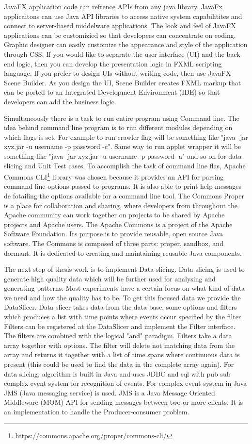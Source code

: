 \documentclass[article,type=msc,colorback,accentcolor=tud9c,twoside,11pt]{tudthesis}
\begin{document}
JavaFX application code can refrence APIs from any java library. JavaFx applicaitons can use Java API libraries to access native system capabilitites and connect to server-based middelware applications. The look and feel of JavaFX applications can be customizied so that developers can concentrate on coding. Graphic designer can easily customize the appearance and style of the application through CSS. If you would like to separate the user interface (UI) and the back-end logic, then you can develop the presentation logic in FXML scripting language. If you prefer to design UIs without writing code, then use JavaFX Scene Builder. As you design the UI, Scene Builder creates FXML markup that can be ported to an Integrated Development Environment (IDE) so that developers can add the business logic.

Simultaneously there is a task to run entire program using Command line. The idea behind command line program is to run different modules depending on which flags is set. For example to run crawler flag will be something like "java -jar xyz.jar -u username -p password -c". Same way to run applet wrapper it will be something like  "java -jar xyz.jar -u username -p password -a" and so on for data slicing and Unit Test cases. To accomplish the task of command line flas, Apache Commons CLI\footnote{https://commons.apache.org/proper/commons-cli/} library was chosen because it provides an API for parsing command line options passed to programs. It is also able to print help messages de fotailing the options available for a command line tool. The Commons Proper is a place for collaboration and sharing, where developers from throughout the Apache community can work together on projects to be shared by Apache projects and Apache users. The Apache Commons is a project of the Apache Software Foundation. Its purpose is to provide reusable, open source Java software. The Commons is composed of three parts: proper, sandbox, and dormant. It is dedicated to creating and maintaining reusable Java components.

The next step of thesis work is to implement Data slicing. Data slicing is used to generate high quality data which will be further used for analysing and generating patterns. Most experiments have a certain focus on what kind of data we need and how the quality has to be. To get this focused data we provide the DataSlicer. Data slicer takes data from the data base, some options and filters which produces a list with time points where events occur specified by the filter. Filters can be registered at the DataSlicer and implement the Filter interface. The filters are combined with the logical "and" paradigm. Filters take a data array together with options. The filter will delete not matching data from the array and returns it together with a list of time spans where continuous data is present (this could be used to find the data in the complete array again). For data  slicing, algorithm is built in Java and uses JDBC and sql with pub sub complex event system for recognition of events. For complex event system in Java JMS (Java messaging service) is used. JMS is a Java Message Oriented Middleware (MOM) API for sending messages between two or more clients. It is an implementation to handle the Producer-consumer problem.
\end{document}
